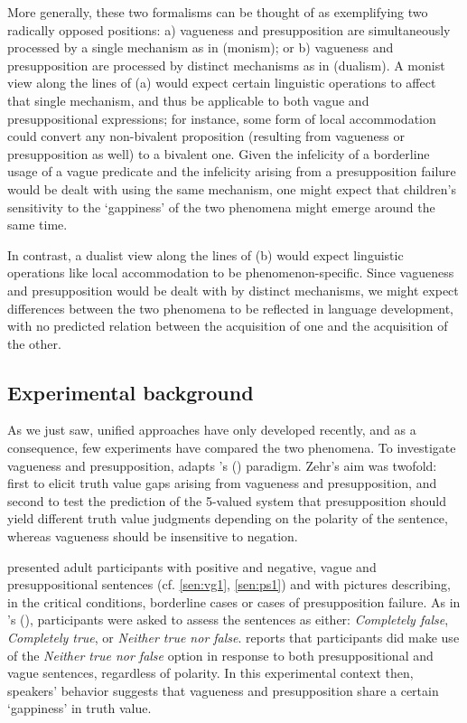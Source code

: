 \documentclass[12pt, letterpaper]{article}
\newcommand\posscite[1]{\citeauthor{#1}'s (\citeyear{#1})}
\begin{document}
{More generally, these two formalisms can be thought of as exemplifying two radically opposed positions: a) vagueness and presupposition are simultaneously processed by a single mechanism as in \cite{Zehr:2014} (monism); or b) vagueness and presupposition are processed by distinct mechanisms as in \cite{spector2015:7valued} (dualism). A monist view along the lines of (a) would expect certain linguistic operations to affect that single mechanism, and thus be applicable to both vague and presuppositional expressions; for instance, some form of local accommodation could convert any non-bivalent proposition (resulting from vagueness or presupposition as well) to a bivalent one. Given the infelicity of a borderline usage of a vague predicate and the infelicity arising from a presupposition failure would be dealt with using the same mechanism, one might expect that children's sensitivity to the `gappiness' of the two phenomena might emerge around the same time.

In contrast, a dualist view along the lines of (b) would expect linguistic operations like local accommodation to be phenomenon-specific. Since vagueness and presupposition would be dealt with by distinct mechanisms, we might expect differences between the two phenomena to be reflected in language development, with no predicted relation between the acquisition of one and the acquisition of the other.

\subsection{Experimental background}
 
As we just saw, unified approaches have only developed recently, and as a consequence, few experiments have compared the two phenomena. To investigate vagueness and presupposition, \cite{Zehr:2014} adapts \posscite{Kriz:2015} paradigm.%
 Zehr's aim was twofold: first to elicit truth value gaps arising from vagueness and presupposition, and second to test the prediction of the 5-valued system that presupposition should yield different truth value judgments depending on the polarity of the sentence, whereas vagueness should be insensitive to negation.

\cite{Zehr:2014} presented adult participants with positive and negative, vague and presuppositional sentences (cf. \ref{sen:vg1}, \ref{sen:ps1}) and with pictures describing, in the critical conditions, borderline cases or cases of presupposition failure. As in \posscite{Kriz:2015}, participants were asked to assess the sentences as either: \textit{Completely false}, \textit{Completely true}, or \textit{Neither true nor false}. \cite{Zehr2015:poster} reports that participants did make use of the \textit{Neither true nor false} option in response to both presuppositional and vague sentences, regardless of polarity. In this experimental context then, speakers' behavior suggests that vagueness and presupposition share a certain `gappiness' in truth value.

}
\end{document}
